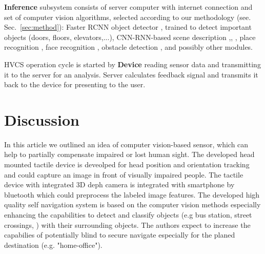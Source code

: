 \documentclass[a4paper,11pt]{article}
\begin{document}
\textbf{Inference} subsystem consists of server computer with internet connection and set of computer vision algorithms, selected according to our methodology (see. Sec.~\ref{sec:method}): Faster RCNN object detector \cite{?}, trained to detect important objects (doors, floors, elevators,...), CNN-RNN-based scene description \cite{Liu},\cite{Ren}, \cite{Dai}, place recognition \cite{Ohn-Bar}, face recognition \cite{Amos}, obstacle detection \cite{Laina}, and possibly other modules. 

HVCS operation cycle is started by \textbf{Device} reading sensor data and transmitting it to the server for an analysis. Server calculates feedback signal and transmits it back to the device for presenting to the user.


\section{Discussion}
\label{sec:discussion}

In this article we outlined an idea of computer vision-based sensor, which can help to partially compensate impaired or lost human sight. The developed head mounted tactile device is deveolped for head position and orientation tracking and could capture an image in front of visually impaired people. The tactile device with integrated 3D deph camera is integrated with smartphone by bluetooth which could preprocess the labeled image features. The developed high quality self navigation system is based on the computer vision methods especially enhancing the capabilities to detect and classify objects (e.g bus station, street crossings, ) with their surrounding objects. The authors expect to increase the capabilies of potentially blind to secure navigate especially for the planed destination (e.g. "home-office"). 
\end{document}
